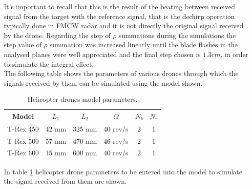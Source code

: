 It's important to recall that this is the result of the beating between received signal from the target with the reference signal, that is the dechirp operation typically done in FMCW radar and it is not directly the original signal received by the drone. Regarding the step of $\rho$ summations during the simulations the step value of $\rho$ summation was increased linearly until the blade flashes in the analysed planes were well appreciated and the final step chosen is $1.3 cm$, in order to simulate the integral effect. \\
The following table shows the parameters of various drones through which the signals received by them can be simulated using the model shown.

\begin{table}[h!]
\centering
\begin{tabular}{|c|c|c|c|c|c|}
\hline
{\color[HTML]{000000} Model} & {\color[HTML]{000000} $L_1$} & {\color[HTML]{000000} $L_2$} & {\color[HTML]{000000} $\Omega$} & {\color[HTML]{000000} $N_b$} & {\color[HTML]{000000} $N_r$}\\\hline
{\color[HTML]{000000} T-Rex 450} & {\color[HTML]{000000} 42 mm} & {\color[HTML]{000000} 325 mm} & {\color[HTML]{000000} 40 rev/s} & {\color[HTML]{000000} 2} & {\color[HTML]{000000} 1}\\ \hline
{\color[HTML]{000000} T-Rex 500} & {\color[HTML]{000000} 57 mm} & {\color[HTML]{000000} 470 mm} & {\color[HTML]{000000} 46 rev/s} & {\color[HTML]{000000} 2} & {\color[HTML]{000000} 1}\\ \hline
{\color[HTML]{000000} T-Rex 600} & {\color[HTML]{000000} 15 mm} & {\color[HTML]{000000} 600 mm} & {\color[HTML]{000000} 40 rev/s} & {\color[HTML]{000000} 2} & {\color[HTML]{000000} 1}\\ \hline
\end{tabular}
\caption{Helicopter drones model parameters. \cite{align}}
\label{tab:Helicopterdroneparams}
\end{table}

In table \ref{tab:Helicopterdroneparams} helicopter drone parameters to be entered into the model to simulate the signal received from them are shown. 

